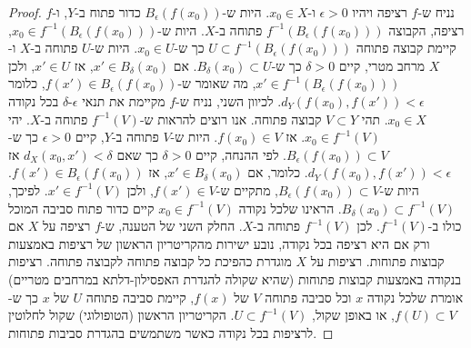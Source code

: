 \documentclass{tstextbook}
\begin{document}
\begin{proof}
נניח ש-\(f\) רציפה ויהיו \(\epsilon > 0\) ו-\(x_0 \in X\). היות ש-\(B_\epsilon(f(x_0))\) כדור פתוח ב-\(Y\), ו-\(f\) רציפה, הקבוצה \(f^{-1}(B_\epsilon(f(x_0)))\) פתוחה ב-\(X\). היות ש-\(x_0 \in f^{-1}(B_\epsilon(f(x_0)))\), קיימת קבוצה פתוחה \(U \subset f^{-1}(B_\epsilon(f(x_0)))\) כך ש-\(x_0 \in U\). היות ש-\(U\) פתוחה ב-\(X\) ו-\(X\) מרחב מטרי, קיים \(\delta > 0\) כך ש-\(B_\delta(x_0) \subset U\). אם \(x' \in B_\delta(x_0)\), אז \(x' \in U\), ולכן \(x' \in f^{-1}(B_\epsilon(f(x_0)))\), מה שאומר ש-\(f(x') \in B_\epsilon(f(x_0))\), כלומר \(d_Y(f(x_0), f(x')) < \epsilon\).
לכיוון השני, נניח ש-\(f\) מקיימת את תנאי \(\epsilon\)-\(\delta\) בכל נקודה \(x_0 \in X\). תהי \(V \subset Y\) קבוצה פתוחה. אנו רוצים להראות ש-\(f^{-1}(V)\) פתוחה ב-\(X\). יהי \(x_0 \in f^{-1}(V)\). אז \(f(x_0) \in V\). היות ש-\(V\) פתוחה ב-\(Y\), קיים \(\epsilon > 0\) כך ש-\(B_\epsilon(f(x_0)) \subset V\). לפי ההנחה, קיים \(\delta > 0\) כך שאם \(d_X(x_0, x') < \delta\) אז \(d_Y(f(x_0), f(x')) < \epsilon\). כלומר, אם \(x' \in B_\delta(x_0)\), אז \(f(x') \in B_\epsilon(f(x_0))\). היות ש-\(B_\epsilon(f(x_0)) \subset V\), מתקיים ש-\(f(x') \in V\), ולכן \(x' \in f^{-1}(V)\). לפיכך, \(B_\delta(x_0) \subset f^{-1}(V)\). הראינו שלכל נקודה \(x_0 \in f^{-1}(V)\) קיים כדור פתוח סביבה המוכל כולו ב-\(f^{-1}(V)\). לכן \(f^{-1}(V)\) פתוחה ב-\(X\).
החלק השני של הטענה, ש-\(f\) רציפה על \(X\) אם ורק אם היא רציפה בכל נקודה, נובע ישירות מהקריטריון הראשון של רציפות באמצעות קבוצות פתוחות. רציפות על \(X\) מוגדרת כהפיכת כל קבוצה פתוחה לקבוצה פתוחה. רציפות בנקודה באמצעות קבוצות פתוחות (שהיא שקולה להגדרת האפסילון-דלתא במרחבים מטריים) אומרת שלכל נקודה \(x\) וכל סביבה פתוחה \(V\) של \(f(x)\), קיימת סביבה פתוחה \(U\) של \(x\) כך ש-\(f(U) \subset V\), או באופן שקול, \(U \subset f^{-1}(V)\). הקריטריון הראשון (הטופולוגי) שקול לחלוטין לרציפות בכל נקודה כאשר משתמשים בהגדרת סביבות פתוחות.

\end{proof}
\end{document}
